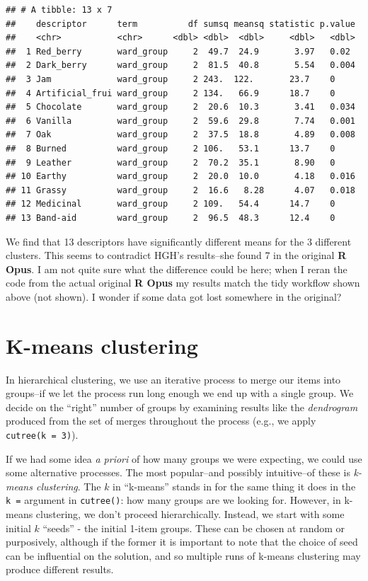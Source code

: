 \documentclass[
]{book}
\begin{document}
\begin{verbatim}
## # A tibble: 13 x 7
##    descriptor      term          df sumsq meansq statistic p.value
##    <chr>           <chr>      <dbl> <dbl>  <dbl>     <dbl>   <dbl>
##  1 Red_berry       ward_group     2  49.7  24.9       3.97   0.02 
##  2 Dark_berry      ward_group     2  81.5  40.8       5.54   0.004
##  3 Jam             ward_group     2 243.  122.       23.7    0    
##  4 Artificial_frui ward_group     2 134.   66.9      18.7    0    
##  5 Chocolate       ward_group     2  20.6  10.3       3.41   0.034
##  6 Vanilla         ward_group     2  59.6  29.8       7.74   0.001
##  7 Oak             ward_group     2  37.5  18.8       4.89   0.008
##  8 Burned          ward_group     2 106.   53.1      13.7    0    
##  9 Leather         ward_group     2  70.2  35.1       8.90   0    
## 10 Earthy          ward_group     2  20.0  10.0       4.18   0.016
## 11 Grassy          ward_group     2  16.6   8.28      4.07   0.018
## 12 Medicinal       ward_group     2 109.   54.4      14.7    0    
## 13 Band-aid        ward_group     2  96.5  48.3      12.4    0
\end{verbatim}

We find that 13 descriptors have significantly different means for the 3 different clusters. This seems to contradict HGH's results--she found 7 in the original \textbf{R Opus}. I am not quite sure what the difference could be here; when I reran the code from the actual original \textbf{R Opus} my results match the tidy workflow shown above (not shown). I wonder if some data got lost somewhere in the original?

\section{K-means clustering}\label{k-means-clustering}

In hierarchical clustering, we use an iterative process to merge our items into groups--if we let the process run long enough we end up with a single group. We decide on the ``right'' number of groups by examining results like the \emph{dendrogram} produced from the set of merges throughout the process (e.g., we apply \texttt{cutree(k\ =\ 3)}).

If we had some idea \emph{a priori} of how many groups we were expecting, we could use some alternative processes. The most popular--and possibly intuitive--of these is \emph{k-means clustering}. The \(k\) in ``k-means'' stands in for the same thing it does in the \texttt{k\ =} argument in \texttt{cutree()}: how many groups are we looking for. However, in k-means clustering, we don't proceed hierarchically. Instead, we start with some initial \(k\) ``seeds'' - the initial 1-item groups. These can be chosen at random or purposively, although if the former it is important to note that the choice of seed can be influential on the solution, and so multiple runs of k-means clustering may produce different results.
\end{document}
